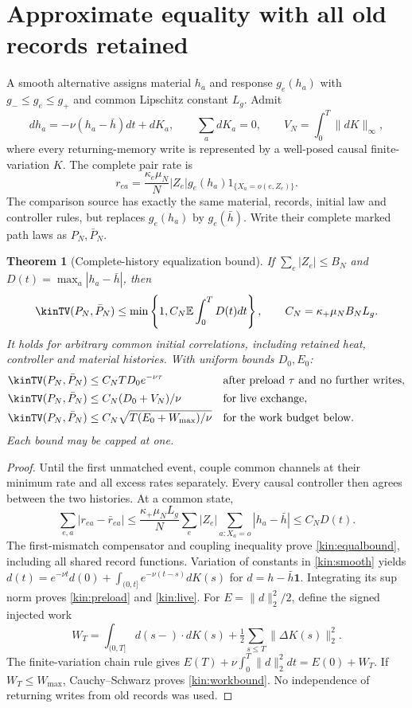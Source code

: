 \documentclass[11pt,oneside,openany]{book}
\newtheorem{theorem}{Theorem}[chapter]
\theoremstyle{definition}
\theoremstyle{remark}\newtheorem{remark}[theorem]{Remark}
\begin{document}
\section{Approximate equality with all old records retained}
A smooth alternative assigns material $h_a$ and response $g_e(h_a)$ with
$g_-\le g_e\le g_+$ and common Lipschitz constant $L_g$. Admit
\begin{equation}
 dh_a=-\nu(h_a-\bar h)dt+dK_a,\qquad
 \sum_a dK_a=0,\qquad
 V_N=\int_0^T\|dK\|_\infty,
 \label{kin:smooth}
\end{equation}
where every returning-memory write is represented by a well-posed causal
finite-variation $K$. The complete pair rate is
\[
 r_{ea}=\frac{\kappa_e\mu_N}{N}|Z_e|g_e(h_a)
 1_{\{X_a=o(e,Z_e)\}}.
\]
The comparison source has exactly the same material, records, initial
law and controller rules, but replaces $g_e(h_a)$ by $g_e(\bar h)$.
Write their complete marked path laws as $P_N,\bar P_N$.

\begin{theorem}[Complete-history equalization bound]\label{kin:equalization}
If $\sum_e|Z_e|\le B_N$ and
$D(t)=\max_a|h_a-\bar h|$, then
\begin{equation}
 \kinTV(P_N,\bar P_N)\le
 \min\left\{1,C_N\mathbb E\int_0^TD(t)dt\right\},\qquad
 C_N=\kappa_+\mu_NB_NL_g.
 \label{kin:equalbound}
\end{equation}
It holds for arbitrary common initial correlations, including retained
heat, controller and material histories. With uniform bounds $D_0,E_0$:
\begin{align}
 \kinTV(P_N,\bar P_N)&\le C_NTD_0e^{-\nu\tau}
 &&\text{after preload $\tau$ and no further writes},\label{kin:preload}\\
 \kinTV(P_N,\bar P_N)&\le C_N(D_0+V_N)/\nu
 &&\text{for live exchange},\label{kin:live}\\
 \kinTV(P_N,\bar P_N)&\le C_N
 \sqrt{T(E_0+W_{\max})/\nu}
 &&\text{for the work budget below}.
 \label{kin:workbound}
\end{align}
Each bound may be capped at one.
\end{theorem}
\begin{proof}
Until the first unmatched event, couple common channels at their minimum
rate and all excess rates separately. Every causal controller then agrees
between the two histories. At a common state,
\[
 \sum_{e,a}|r_{ea}-\bar r_{ea}|
 \le\frac{\kappa_+\mu_NL_g}{N}\sum_e|Z_e|
 \sum_{a:X_a=o}|h_a-\bar h|\le C_ND(t).
\]
The first-mismatch compensator and coupling inequality prove
\eqref{kin:equalbound}, including all shared record functions. Variation
of constants in \eqref{kin:smooth} yields
$d(t)=e^{-\nu t}d(0)+\int_{(0,t]}e^{-\nu(t-s)}dK(s)$ for
$d=h-\bar h\mathbf1$. Integrating its sup norm proves
\eqref{kin:preload} and \eqref{kin:live}.
For $E=\|d\|_2^2/2$, define the signed injected work
\[
 W_T=\int_{(0,T]}d(s-)\cdot dK(s)
 +\tfrac12\sum_{s\le T}\|\Delta K(s)\|_2^2.
\]
The finite-variation chain rule gives
$E(T)+\nu\int_0^T\|d\|_2^2dt=E(0)+W_T$.
If $W_T\le W_{\max}$, Cauchy--Schwarz proves \eqref{kin:workbound}.
No independence of returning writes from old records was used.
\end{proof}
\end{document}
